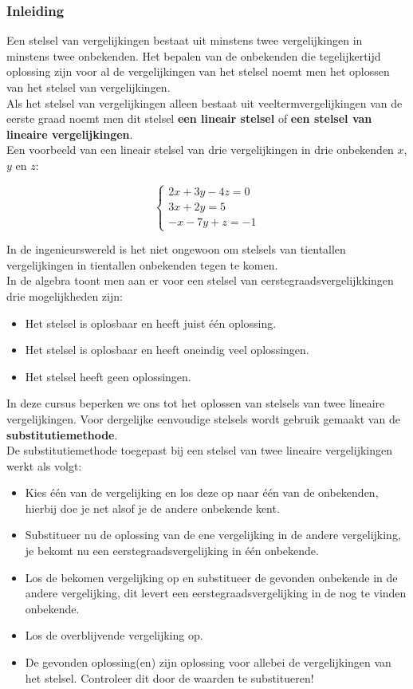 \subsubsection{Inleiding}

Een stelsel van vergelijkingen bestaat uit minstens twee vergelijkingen in minstens twee onbekenden. Het bepalen van de onbekenden die tegelijkertijd oplossing zijn voor al de vergelijkingen van het stelsel noemt men het oplossen van het stelsel van vergelijkingen.\\

Als het stelsel van vergelijkingen alleen bestaat uit veeltermvergelijkingen van de eerste graad noemt men dit stelsel {\bf een lineair stelsel} of {\bf een stelsel van lineaire vergelijkingen}.\\ Een voorbeeld van een lineair stelsel van drie vergelijkingen in drie onbekenden $x$, $y$ en $z$:

\[\left\{ {
\begin{array}{l}
2x + 3y - 4z = 0\\
3x + 2y =  5\\
-x - 7y + z = -1
\end{array}} \right.\]

In de ingenieurswereld is het niet ongewoon om stelsels van tientallen vergelijkingen in tientallen onbekenden tegen te komen.\\


In de algebra toont men aan er voor een stelsel van eerstegraadsvergelijkkingen drie mogelijkheden zijn:
\begin{itemize}
\item Het stelsel is oplosbaar en heeft juist \'{e}\'{e}n oplossing.
\item Het stelsel is oplosbaar en heeft oneindig veel oplossingen.
\item Het stelsel heeft geen oplossingen.
\end{itemize}

In deze cursus beperken we ons tot het oplossen van stelsels van twee lineaire vergelijkingen. Voor dergelijke eenvoudige stelsels wordt gebruik gemaakt van de {\bf substitutiemethode}. \\

De substitutiemethode toegepast bij een stelsel van twee lineaire vergelijkingen werkt als volgt:
\begin{itemize}
\item Kies \'{e}\'{e}n van de vergelijking en los deze op naar \'{e}\'{e}n van de onbekenden, hierbij doe je net alsof je de andere onbekende kent.
\item Substitueer nu de oplossing van de ene vergelijking in de andere vergelijking, je bekomt nu een eerstegraadsvergelijking in \'{e}\'{e}n onbekende.
\item Los de bekomen vergelijking op en substitueer de gevonden onbekende in de andere vergelijking, dit levert een eerstegraadsvergelijking in de nog te vinden onbekende.
\item Los de overblijvende vergelijking op.
\item De gevonden oplossing(en) zijn oplossing voor allebei de vergelijkingen van het stelsel. Controleer dit door de waarden te substitueren!
\end{itemize}


